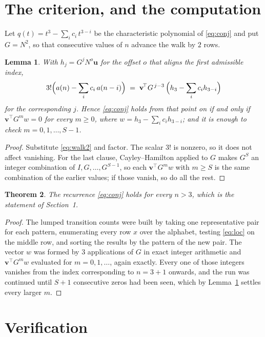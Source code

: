 \documentclass[11pt,a4paper]{article}
\theoremstyle{plain}
\newtheorem{theorem}{Theorem}
\newtheorem{lemma}[theorem]{Lemma}
\theoremstyle{definition}
\begin{document}
\section{The criterion, and the computation}

Let $q(t)=t^{3}-\sum_i c_i\,t^{3-i}$ be the characteristic polynomial of
\eqref{eq:conj} and put $G=N^{2}$, so that consecutive values of $n$ advance the
walk by $2$ rows.

\begin{lemma}\label{lem:crit}
With $h_j=G^{j}N^{o}\mathbf{u}$ for the offset $o$ that aligns the first admissible
index,
\[
3!\Bigl(a(n)-\sum_i c_i\,a(n-i)\Bigr)\;=\;\mathbf{v}^{\!\top}G^{\,j-3}\,
\Bigl(h_{3}-\sum_i c_i h_{3-i}\Bigr)
\]
for the corresponding $j$. Hence \eqref{eq:conj} holds from that point on if and only if
$\mathbf{v}^{\!\top}G^{m}w=0$ for every $m\ge0$, where
$w=h_{3}-\sum_i c_ih_{3-i}$; and it is enough to check $m=0,1,\dots,S-1$.
\end{lemma}

\begin{proof}
Substitute \eqref{eq:walk2} and factor. The scalar $3!$ is nonzero, so it does not
affect vanishing. For the last clause, Cayley--Hamilton applied to $G$ makes $G^{S}$ an
integer combination of $I,G,\dots,G^{S-1}$, so each $\mathbf{v}^{\!\top}G^{m}w$ with
$m\ge S$ is the same combination of the earlier values; if those vanish, so do all the rest.
\end{proof}

\begin{theorem}
The recurrence \eqref{eq:conj} holds for every $n>3$, which is the statement of
Section~1.
\end{theorem}

\begin{proof}
The lumped transition counts were built by taking one representative pair for each pattern,
enumerating every row $x$ over the alphabet, testing \eqref{eq:loc} on the middle
row, and sorting the results by the pattern of the new pair. The vector $w$ was formed by
$3$ applications of $G$ in exact integer arithmetic and $\mathbf{v}^{\!\top}G^{m}w$
evaluated for $m=0,1,\dots$, again exactly. Every one of those integers vanishes from the
index corresponding to $n=3+1$ onwards, and the run was continued until $S+1$
consecutive zeros had been seen, which by Lemma~\ref{lem:crit} settles every larger $m$.
\end{proof}

\section{Verification}
\end{document}
